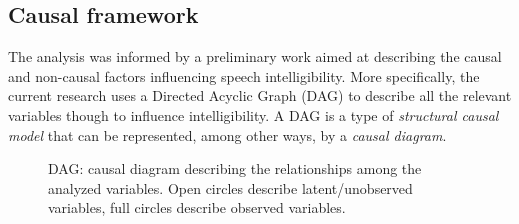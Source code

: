 \subsection{Causal framework} \label{sS:causal_frame}
%
The analysis was informed by a preliminary work aimed at describing the causal and non-causal factors influencing speech intelligibility. More specifically, the current research uses a Directed Acyclic Graph (DAG) \cite{Pearl_2009, Cinelli_et_al_2021} to describe all the relevant variables though to influence intelligibility. A DAG is a type of \textit{structural causal model} that can be represented, among other ways, by a \textit{causal diagram}. 
%
\begin{figure}[h!]
	\centering
	\caption[DAG: causal diagram]{DAG: causal diagram describing the relationships among the analyzed variables. Open circles describe latent/unobserved variables, full circles describe observed variables.}
	\label{fig:DAG}
\end{figure}

